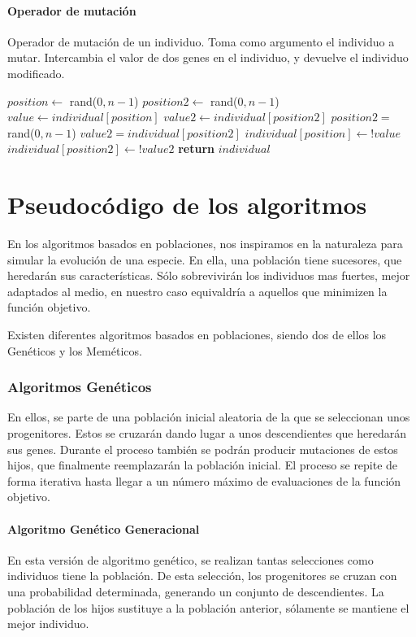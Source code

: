 \subsection{Operador de mutación}
\begin{algorithm}[H]
    \caption{Operador de mutación de un individuo. Toma como argumento el individuo a mutar. Intercambia el valor de dos genes en el individuo, y devuelve el individuo modificado.}
\begin{algorithmic}
    \State $position \leftarrow$ rand($0, n-1$)
    \State $position2 \leftarrow$ rand($0, n-1$)
    \State $value \leftarrow individual[position]$
    \State $value2 \leftarrow individual[position2]$ 
    \State
        \State $position2 = $ rand($0, n-1$)
        \State $value2 = individual[position2]$
    \EndWhile
    \State
    \State $individual[position] \leftarrow !value$
    \State $individual[position2] \leftarrow !value2$
    \State \textbf{return} $individual$
\EndProcedure
\end{algorithmic}
\end{algorithm}

\part{Pseudocódigo de los algoritmos}
En los algoritmos basados en poblaciones, nos inspiramos en la naturaleza para simular la evolución de una especie. En ella, una población tiene sucesores, que heredarán sus características. Sólo sobrevivirán los individuos mas fuertes, mejor adaptados al medio, en nuestro caso equivaldría a aquellos que minimizen la función objetivo.

Existen diferentes algoritmos basados en poblaciones, siendo dos de ellos los Genéticos y los Meméticos.

\section{Algoritmos Genéticos}
En ellos, se parte de una población inicial aleatoria de la que se seleccionan unos progenitores. Estos se cruzarán dando lugar a unos descendientes que heredarán sus genes. Durante el proceso también se podrán producir mutaciones de estos hijos, que finalmente reemplazarán la población inicial. El proceso se repite de forma iterativa hasta llegar a un número máximo de evaluaciones de la función objetivo.

\subsection{Algoritmo Genético Generacional}
En esta versión de algoritmo genético, se realizan tantas selecciones como individuos tiene la población. De esta selección, los progenitores se cruzan con una probabilidad determinada, generando un conjunto de descendientes. La población de los hijos sustituye a la población anterior, sólamente se mantiene el mejor individuo.


